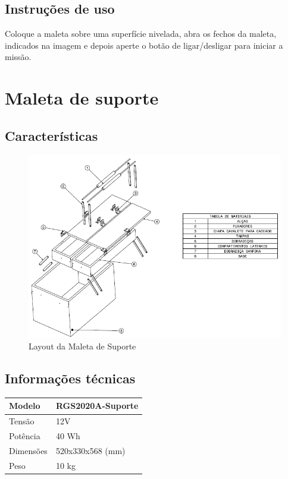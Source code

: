 \subsection*{Instruções de uso}

\par Coloque a maleta sobre uma superfície nivelada, abra os fechos da maleta, indicados na imagem e depois aperte o botão de ligar/desligar para iniciar a missão.

\section*{Maleta de suporte}

\subsection*{Características}

\begin{figure}[H]
  \centering
  \includegraphics[scale=0.8]{Figuras/suporte_explode.png}
  \caption{Layout da Maleta de Suporte}
  \label{fig:suporte_explode}
\end{figure}

\subsection*{Informações técnicas}

\begin{table}[H]
\centering
\begin{tabular}{|l|l|}
\hline
Modelo & RGS2020A-Suporte \\ \hline
Tensão & 12V \\ \hline
Potência & 40 Wh \\ \hline
Dimensões & 520x330x568 (mm)\\ \hline
Peso & 10 kg \\ \hline
\end{tabular}
\end{table}

